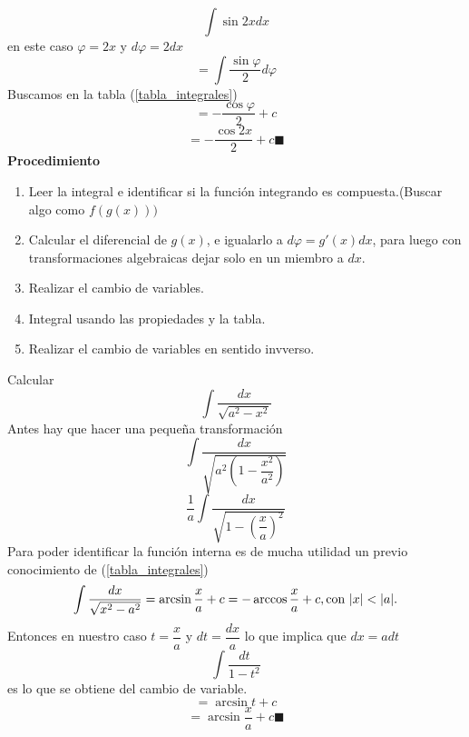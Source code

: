 \documentclass[10pt,twoside]{SelfArx} %
\begin{document}
 \begin{equation}
 \int\sin2xdx
 \end{equation}
 en este caso $ \varphi=2x $ y $ d\varphi=2dx $
 \begin{equation}
 =\int \dfrac{\sin\varphi}{2} d\varphi
 \end{equation}
 Buscamos en la tabla (\ref{tabla_integrales})
 \begin{equation}
 =-\dfrac{\cos\varphi}{2}+c
 \end{equation}
 \begin{equation}
 =-\dfrac{\cos 2x}{2}+c\blacksquare
 \end{equation}
 \textbf{Procedimiento}
 \begin{enumerate}
 	\item Leer la integral e identificar si la funci\'on integrando es compuesta.(Buscar algo como $ f(g(x))) $
 	\item Calcular el diferencial de $ g(x) $, e igualarlo a $ d\varphi=g'(x)dx $, para luego con transformaciones algebraicas dejar solo en un miembro a $ dx $.
 	\item Realizar el cambio de variables.
 	\item Integral usando las propiedades y la tabla.
 	\item Realizar el cambio de variables en sentido invverso.
 \end{enumerate}
 
 \begin{ejemplo}
 	Calcular
 	\begin{equation}
 	\int \dfrac{dx}{\sqrt{a^{2}-x^{2}}}
 	\end{equation}
 	Antes hay que hacer una pequeña transformación
 	\begin{equation}
\displaystyle\int \dfrac{dx}{\sqrt{a^{2}\left (1-\dfrac{x^{2}}{a^{2}}\right )}}
 	\end{equation}
 	\begin{equation}
 	\displaystyle\dfrac{1}{a}\int \dfrac{dx}{\sqrt{1-(\dfrac{x}{a})^{2}}}
 	\end{equation}
 	Para poder identificar la función interna es de mucha utilidad un previo conocimiento de (\ref{tabla_integrales})
	 \[ \displaystyle\int \dfrac{dx}{\sqrt{x^{2}-a^{2}}}=\arcsin \dfrac{x}{a}+c=-\arccos\dfrac{x}{a}+c, \mbox{con $ |x|<|a| $.} \]
	 Entonces en nuestro caso $ t=\dfrac{x}{a} $ y $ dt=\dfrac{dx}{a} $ lo que implica que $ dx=adt $
	 \begin{equation}
	 \int \dfrac{dt}{1-t^{2}}
	 \end{equation}
es lo que se obtiene del cambio de variable.
\begin{equation}
=\arcsin t +c
\end{equation}
\begin{equation}
=\arcsin \dfrac{x}{a}+c\blacksquare
\end{equation}

 \end{ejemplo}
 
\end{document}
